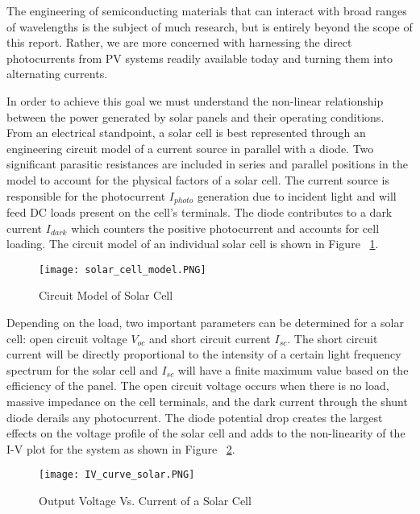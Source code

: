 The engineering of semiconducting materials that can interact with broad ranges of wavelengths is the subject of much research, but is entirely beyond the scope of this report. Rather, we are more concerned with harnessing the direct photocurrents from PV systems readily available today and turning them into alternating currents. 

In order to achieve this goal we must understand the non-linear relationship between the power generated by solar panels and their operating conditions. From an electrical standpoint, a solar cell is best represented through an engineering circuit model of a current source in parallel with a diode. Two significant parasitic resistances are included in series and parallel positions in the model to account for the physical factors of a solar cell. The current source is responsible for the photocurrent $I_{photo}$ generation due to incident light and will feed DC loads present on the cell's terminals. The diode contributes to a dark current $I_{dark}$ which counters the positive photocurrent and accounts for cell loading. The circuit model of an individual solar cell is shown in Figure ~\ref{circuitModel}. \cite{soteris}

\begin{figure}
\centering
\texttt{[image: solar\_cell\_model.PNG]}
\caption{Circuit Model of Solar Cell\cite{soteris}}
\label{circuitModel}
\end{figure}

Depending on the load, two important parameters can be determined for a solar cell: open circuit voltage $V_{oc}$ and short circuit current $I_{sc}$. The short circuit current will be directly proportional to the intensity of a certain light frequency spectrum for the solar cell and $I_{sc}$ will have a finite maximum value based on the efficiency of the panel. The open circuit voltage occurs when there is no load, massive impedance on the cell terminals, and the dark current through the shunt diode derails any photocurrent. The diode potential drop creates the largest effects on the voltage profile of the solar cell and adds to the non-linearity of the I-V plot for the system as shown in Figure ~\ref{Output Voltage Vs. Current of a Solar Cell}. \cite{soteris}

\begin{figure}
\centering
\texttt{[image: IV\_curve\_solar.PNG]}
\caption{Output Voltage Vs. Current of a Solar Cell\cite{soteris}}
\label{Output Voltage Vs. Current of a Solar Cell}
\end{figure}

